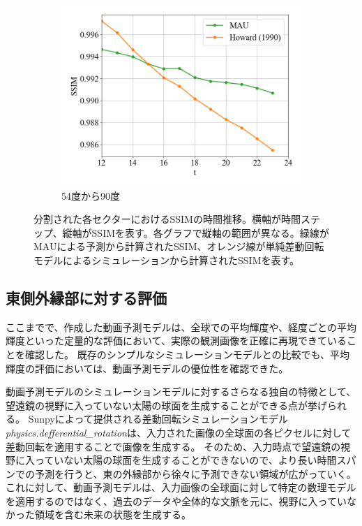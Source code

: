 \begin{figure}[htbp]
            \begin{subfigure}{0.5\textwidth}
              \centering
              \includegraphics[width=\textwidth]{figures/exp1/lng_ssim_5.png}
              \caption{54度から90度}
            \end{subfigure}
            \label{fig:lng_ssim}
            \caption{分割された各セクターにおけるSSIMの時間推移。横軸が時間ステップ、縦軸がSSIMを表す。各グラフで縦軸の範囲が異なる。緑線がMAUによる予測から計算されたSSIM、オレンジ線が単純差動回転モデルによるシミュレーションから計算されたSSIMを表す。}
          \end{figure}

    
    \subsection{東側外縁部に対する評価}
      ここまでで、作成した動画予測モデルは、全球での平均輝度や、経度ごとの平均輝度といった定量的な評価において、実際の観測画像を正確に再現できていることを確認した。
      既存のシンプルなシミュレーションモデルとの比較でも、平均輝度の評価においては、動画予測モデルの優位性を確認できた。

      動画予測モデルのシミュレーションモデルに対するさらなる独自の特徴として、望遠鏡の視野に入っていない太陽の球面を生成することができる点が挙げられる。
      Sunpyによって提供される差動回転シミュレーションモデル\textit{physics.defferential\_rotation}は、入力された画像の全球面の各ピクセルに対して差動回転を適用することで画像を生成する。
      そのため、入力時点で望遠鏡の視野に入っていない太陽の球面を生成することができないので、より長い時間スパンでの予測を行うと、東の外縁部から徐々に予測できない領域が広がっていく。
      これに対して、動画予測モデルは、入力画像の全球面に対して特定の数理モデルを適用するのではなく、過去のデータや全体的な文脈を元に、視野に入っていなかった領域を含む未来の状態を生成する。
      
